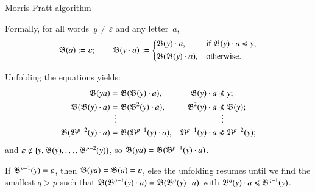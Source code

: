 %
\begin{frame}{Morris-Pratt algorithm}

Formally, for all words~\({y \neq \varepsilon}\) and any
letter~\(a\),
\begin{equation*}
  \mathfrak{B}^{}(a)         := \varepsilon;\qquad
  \mathfrak{B}^{}(y \cdot a) := \left\{
    \begin{aligned}
      & \mathfrak{B}^{}(y) \cdot a,
      && \text{if \(\mathfrak{B}^{}(y) \cdot a \mathrel{\preccurlyeq}y\)};\\
      & \mathfrak{B}^{}(\mathfrak{B}^{}(y) \cdot a),
      && \text{otherwise.}
    \end{aligned}
  \right.
\end{equation*}

Unfolding the equations yields:
\begin{align*}
   \Border{}{ya}
&= \Border{}{\Border{}{y} \cdot a},
& \Border{}{y} \cdot a &\nprefeq y;\\
   \Border{}{\Border{}{y} \cdot a}
&= \Border{}{\Border{2}{y} \cdot a},
&  \Border{2}{y} \cdot a &\nprefeq \Border{}{y};\\
&\;\;\smash{\vdots} & &\;\;\smash{\vdots}\\
   \smash{\Border{}{\Border{p-2}{y} \cdot a}}
&= \smash{\Border{}{\Border{p-1}{y} \cdot a}},
& \smash{\Border{p-1}{y} \cdot a} &\nprefeq \smash{\Border{p-2}{y}};
\end{align*}
and \(\varepsilon \not\in \{y,\mathfrak{B}^{}(y), \dots,
\mathfrak{B}^{p-2}(y)\}\), so \(\mathfrak{B}^{}(ya) =
\smash{\mathfrak{B}^{}(\mathfrak{B}^{p-1}(y) \cdot a)}\).

If \(\mathfrak{B}^{p-1}(y) = \varepsilon\), then \(\mathfrak{B}^{}(ya) =
\mathfrak{B}^{}(a) = \varepsilon\), else the unfolding resumes until we find
the smallest \(q > p\) such that \(\mathfrak{B}^{}(\mathfrak{B}^{q-1}(y) \cdot a)
= \mathfrak{B}^{}(\mathfrak{B}^{q}(y) \cdot a)\) with \(\mathfrak{B}^{q}(y) \cdot a
\mathrel{\preccurlyeq} \mathfrak{B}^{q-1}(y)\).


\end{frame}

